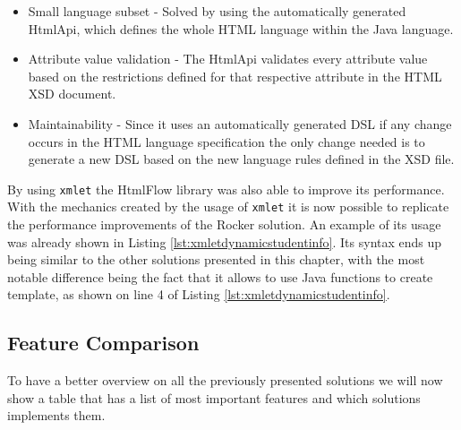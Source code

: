 \begin{itemize}
	\item Small language subset - Solved by using the automatically generated HtmlApi, which defines the whole \ac{HTML} language within the Java language.
	\item Attribute value validation - The HtmlApi validates every attribute value based on the restrictions defined for that respective attribute in the \ac{HTML} \ac{XSD} document.
	\item Maintainability - Since it uses an automatically generated \ac{DSL} if any change occurs in the \ac{HTML} language specification the only change needed is to generate a new \ac{DSL} based on the new language rules defined in the \ac{XSD} file.
\end{itemize}

\noindent
By using \texttt{xmlet} the HtmlFlow library was also able to improve its performance. With the mechanics created by the usage of \texttt{xmlet} it is now possible to replicate the performance improvements of the Rocker solution. An example of its usage was already shown in Listing \ref{lst:xmletdynamicstudentinfo}. Its syntax ends up being similar to the other solutions presented in this chapter, with the most notable difference being the fact that it allows to use Java functions to create template, as shown on line 4 of Listing \ref{lst:xmletdynamicstudentinfo}.

\newpage

\subsection{Feature Comparison}
\label{sec:featurecomparison}

To have a better overview on all the previously presented solutions we will now show a table that has a list of most important features and which solutions implements them.

